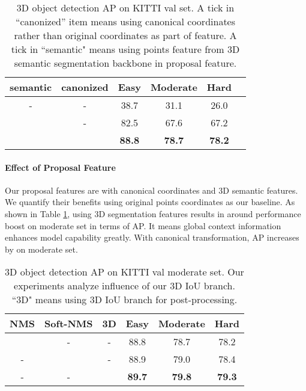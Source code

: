 \documentclass[10pt,twocolumn,letterpaper]{article}
\begin{document}
\begin{table}[t]
   \centering \addtolength{\tabcolsep}{-1pt}
   \footnotesize
   \begin{tabular}{|c|c|c|c|c|c|}
       \hline
       semantic & canonized  & Easy & Moderate & Hard \\
       \hline
       - & - & 38.7 & 31.1 & 26.0 \\
        & - & 82.5 & 67.6 & 67.2 \\
        &  & \bf 88.8 & \bf 78.7 & \bf 78.2 \\
      \hline
   \end{tabular}\vspace{0.1cm}
   \caption{3D object detection AP on KITTI val set. A tick in “canonized” item means using canonical coordinates rather than original coordinates as part of feature. A tick in ``semantic" means using points feature from 3D semantic segmentation backbone in proposal feature.}\vspace{-0.05in}
   \label{tab:whether_coord}
\end{table}

\vspace{-0.1in}
\paragraph{Effect of Proposal Feature}
Our proposal features are with canonical coordinates and 3D semantic features. We quantify their benefits using original points coordinates as our baseline. As shown in Table \ref{tab:whether_coord}, using 3D segmentation features results in around  performance boost on moderate set in terms of AP. It means global context information enhances model capability greatly. With canonical transformation, AP increases by  on moderate set. 

\begin{table}[t]
	\centering \addtolength{\tabcolsep}{-1pt}
	\footnotesize
	\begin{tabular}{|c|c|c|c|c|c|}
		\hline
		NMS & Soft-NMS & 3D & Easy & Moderate & Hard \\
		\hline
		 & - & - & 88.8 & 78.7 & 78.2 \\
		- &  & - & 88.9 & 79.0 & 78.4 \\
		- & - &  & \bf 89.7 & \bf 79.8 & \bf 79.3 \\
		\hline
	\end{tabular}\vspace{0.1cm}
	\caption{3D object detection AP on KITTI val moderate set. Our experiments analyze influence of our 3D IoU branch. ``3D" means using 3D IoU branch for post-processing.}
	\label{tab:whether_iou_branch}
\end{table}
\end{document}
